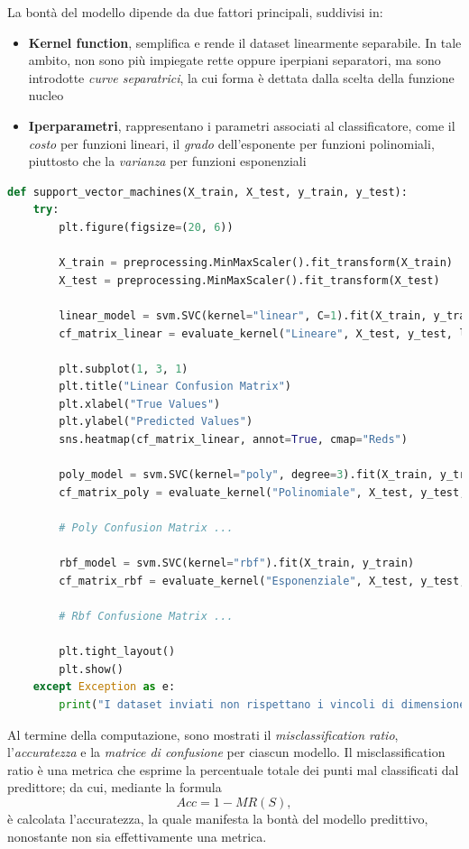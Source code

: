\documentclass{article}
\begin{document}
    La bontà del modello dipende da due fattori principali, suddivisi in:
    \begin{itemize}
        \renewcommand{\labelitemi}{-}
        \setlength\parskip{0pt}
        \item \textbf{Kernel function}, semplifica e rende il dataset linearmente separabile. In tale ambito, non sono più impiegate rette oppure iperpiani separatori, ma sono introdotte \textit{curve separatrici}, la cui forma è dettata dalla scelta della funzione nucleo
        \item \textbf{Iperparametri}, rappresentano i parametri associati al classificatore, come il \textit{costo} per funzioni lineari, il \textit{grado} dell'esponente per funzioni polinomiali, piuttosto che la \textit{varianza} per funzioni esponenziali
    \end{itemize}
    \begin{lstlisting}[language=Python]
def support_vector_machines(X_train, X_test, y_train, y_test):
    try:
        plt.figure(figsize=(20, 6))

        X_train = preprocessing.MinMaxScaler().fit_transform(X_train)
        X_test = preprocessing.MinMaxScaler().fit_transform(X_test)

        linear_model = svm.SVC(kernel="linear", C=1).fit(X_train, y_train)
        cf_matrix_linear = evaluate_kernel("Lineare", X_test, y_test, linear_model)

        plt.subplot(1, 3, 1)
        plt.title("Linear Confusion Matrix")
        plt.xlabel("True Values")
        plt.ylabel("Predicted Values")
        sns.heatmap(cf_matrix_linear, annot=True, cmap="Reds")

        poly_model = svm.SVC(kernel="poly", degree=3).fit(X_train, y_train)
        cf_matrix_poly = evaluate_kernel("Polinomiale", X_test, y_test, poly_model)

        # Poly Confusion Matrix ...

        rbf_model = svm.SVC(kernel="rbf").fit(X_train, y_train)
        cf_matrix_rbf = evaluate_kernel("Esponenziale", X_test, y_test, rbf_model)

        # Rbf Confusione Matrix ...

        plt.tight_layout()
        plt.show()
    except Exception as e:
        print("I dataset inviati non rispettano i vincoli di dimensione")
    \end{lstlisting}
    Al termine della computazione, sono mostrati il \textit{misclassification ratio}, l'\textit{accuratezza} e la \textit{matrice di confusione} per ciascun modello. Il misclassification ratio è una metrica che esprime la percentuale totale dei punti mal classificati dal predittore; da cui, mediante la formula $$Acc=1-MR(S),$$ è calcolata l'accuratezza, la quale manifesta la bontà del modello predittivo, nonostante non sia effettivamente una metrica.
\end{document}

